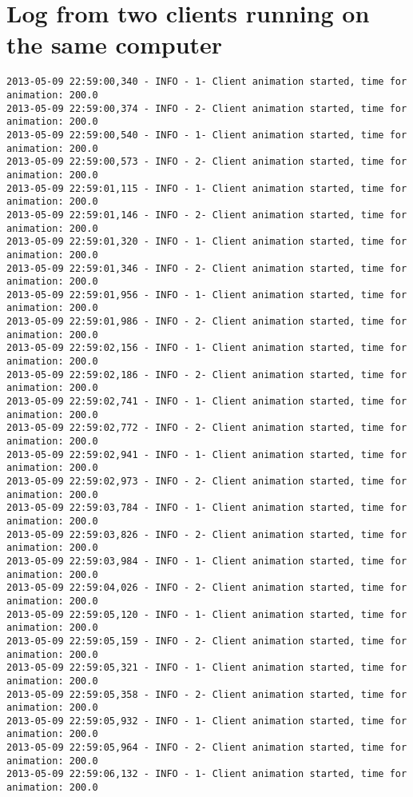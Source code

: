 \chapter{Log from two clients running on the same computer}
\begin{verbatim}
2013-05-09 22:59:00,340 - INFO - 1- Client animation started, time for animation: 200.0
2013-05-09 22:59:00,374 - INFO - 2- Client animation started, time for animation: 200.0
2013-05-09 22:59:00,540 - INFO - 1- Client animation started, time for animation: 200.0
2013-05-09 22:59:00,573 - INFO - 2- Client animation started, time for animation: 200.0
2013-05-09 22:59:01,115 - INFO - 1- Client animation started, time for animation: 200.0
2013-05-09 22:59:01,146 - INFO - 2- Client animation started, time for animation: 200.0
2013-05-09 22:59:01,320 - INFO - 1- Client animation started, time for animation: 200.0
2013-05-09 22:59:01,346 - INFO - 2- Client animation started, time for animation: 200.0
2013-05-09 22:59:01,956 - INFO - 1- Client animation started, time for animation: 200.0
2013-05-09 22:59:01,986 - INFO - 2- Client animation started, time for animation: 200.0
2013-05-09 22:59:02,156 - INFO - 1- Client animation started, time for animation: 200.0
2013-05-09 22:59:02,186 - INFO - 2- Client animation started, time for animation: 200.0
2013-05-09 22:59:02,741 - INFO - 1- Client animation started, time for animation: 200.0
2013-05-09 22:59:02,772 - INFO - 2- Client animation started, time for animation: 200.0
2013-05-09 22:59:02,941 - INFO - 1- Client animation started, time for animation: 200.0
2013-05-09 22:59:02,973 - INFO - 2- Client animation started, time for animation: 200.0
2013-05-09 22:59:03,784 - INFO - 1- Client animation started, time for animation: 200.0
2013-05-09 22:59:03,826 - INFO - 2- Client animation started, time for animation: 200.0
2013-05-09 22:59:03,984 - INFO - 1- Client animation started, time for animation: 200.0
2013-05-09 22:59:04,026 - INFO - 2- Client animation started, time for animation: 200.0
2013-05-09 22:59:05,120 - INFO - 1- Client animation started, time for animation: 200.0
2013-05-09 22:59:05,159 - INFO - 2- Client animation started, time for animation: 200.0
2013-05-09 22:59:05,321 - INFO - 1- Client animation started, time for animation: 200.0
2013-05-09 22:59:05,358 - INFO - 2- Client animation started, time for animation: 200.0
2013-05-09 22:59:05,932 - INFO - 1- Client animation started, time for animation: 200.0
2013-05-09 22:59:05,964 - INFO - 2- Client animation started, time for animation: 200.0
2013-05-09 22:59:06,132 - INFO - 1- Client animation started, time for animation: 200.0

\end{verbatim}
